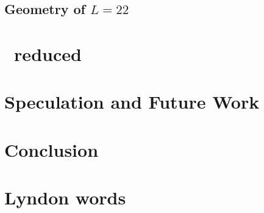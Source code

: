     \section{Geometry of $L=22$ \statesp}
    \label{sec:L22}
    

\chapter{\KS\ reduced \statesp}
    \label{chap:kseRedStSp}	
    


\chapter{Speculation and Future Work}
   \label{chap:tobedone}
   

\chapter{Conclusion}
   \label{chap:concl}
   


\appendix

\chapter{Lyndon words}


